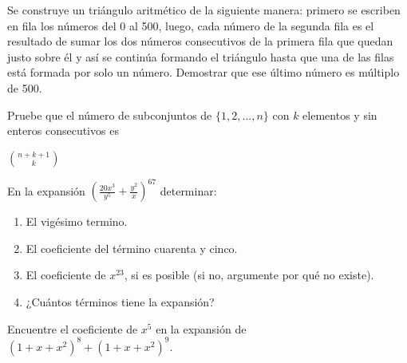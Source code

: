\begin{ejercicio}
    Se construye un triángulo aritmético de la siguiente manera: primero se escriben en fila los números del 0 al 500, luego, cada número de la segunda fila es el resultado de sumar los dos números consecutivos de la primera fila que quedan justo sobre él y así se continúa formando el triángulo hasta que una de las filas está formada por solo un número. Demostrar que ese último número es múltiplo de 500.
\end{ejercicio}

\begin{ejercicio}
    Pruebe que el número de subconjuntos de $\{1, 2, ..., n\}$ con $k$ elementos y sin enteros consecutivos es

    \begin{center}
        $\binom{n+k+1}{k}$
    \end{center}
\end{ejercicio}

\begin{ejercicio}
    En la expansión $(\frac{20x^3}{y^5} + \frac{y^2}{x})^{67}$ determinar:

    \renewcommand{\labelenumi}{\alph{enumi})}
    \begin{enumerate}
        \item El vigésimo termino.
        \item El coeficiente del término cuarenta y cinco.
        \item El coeficiente de $x^{23}$, si es posible (si no, argumente por qué no existe).
        \item ¿Cuántos términos tiene la expansión?
    \end{enumerate}
\end{ejercicio}

\begin{ejercicio}
    Encuentre el coeficiente de $x^5$ en la expansión de $(1 +x+x^2)^8 + (1 +x+x^2)^9$.
\end{ejercicio}